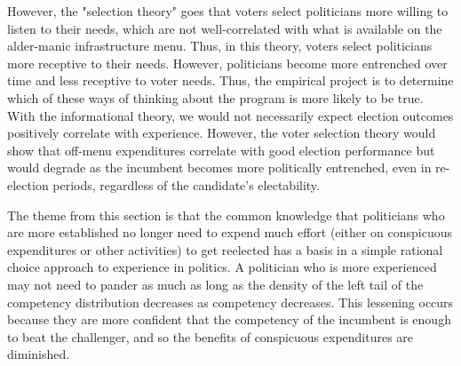However, the "selection theory" goes that voters select politicians more willing to listen to their needs, which are not well-correlated with what is available on the alder-manic infrastructure menu. 
Thus, in this theory, voters select politicians more receptive to their needs. 
However, politicians become more entrenched over time and less receptive to voter needs. 
Thus, the empirical project is to determine which of these ways of thinking about the program is more likely to be true. 
With the informational theory, we would not necessarily expect election outcomes positively correlate with experience. 
However, the voter selection theory would show that off-menu expenditures correlate with good election performance but would degrade as the incumbent becomes more politically entrenched, even in re-election periods, regardless of the candidate's electability. 

The theme from this section is that the common knowledge that politicians who are more established no longer need to expend much effort (either on conspicuous expenditures or other activities) to get reelected has a basis in a simple rational choice approach to experience in politics. 
A politician who is more experienced may not need to pander as much as long as the density of the left tail of the competency distribution decreases as competency decreases. 
This lessening occurs because they are more confident that the competency of the incumbent is enough to beat the challenger, and so the benefits of conspicuous expenditures are diminished. 